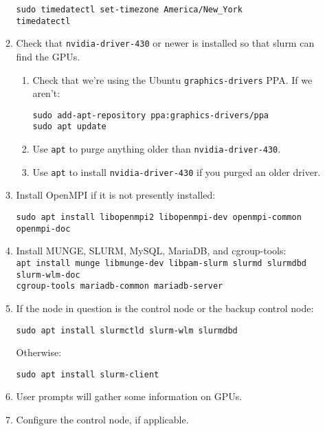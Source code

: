 \begin{enumerate}
\begin{enumerate}
        \texttt{sudo timedatectl set-timezone America/New\_York} \\
        \texttt{timedatectl}

      \item Check that \texttt{nvidia-driver-430} or newer is installed so that slurm can find the GPUs.

        \begin{enumerate}
          \item Check that we're using the Ubuntu \texttt{graphics-drivers} PPA. If we aren't:

            \texttt{sudo add-apt-repository ppa:graphics-drivers/ppa} \\
            \texttt{sudo apt update}

          \item Use \texttt{apt} to purge anything older than \texttt{nvidia-driver-430}.

          \item Use \texttt{apt} to install \texttt{nvidia-driver-430} if you purged an older driver.

        \end{enumerate}

      \item Install OpenMPI if it is not presently installed:

        \texttt{sudo apt install libopenmpi2 libopenmpi-dev openmpi-common openmpi-doc}

      \item Install MUNGE, SLURM, MySQL, MariaDB, and cgroup-tools: \\
        \texttt{apt install munge libmunge-dev libpam-slurm slurmd slurmdbd slurm-wlm-doc \\ cgroup-tools mariadb-common mariadb-server} %

      \item If the node in question is the control node or the backup control node:

        \texttt{sudo apt install slurmctld slurm-wlm slurmdbd}

        Otherwise:

        \texttt{sudo apt install slurm-client} 

      \item User prompts will gather some information on GPUs.

      \item Configure the control node, if applicable. 


\end{enumerate}
\end{enumerate}
